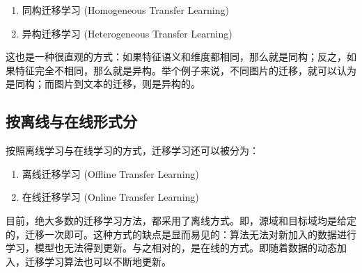 \begin{enumerate}
	\item 同构迁移学习 (Homogeneous Transfer Learning)
	\item 异构迁移学习 (Heterogeneous Transfer Learning)
\end{enumerate}

这也是一种很直观的方式：如果特征语义和维度都相同，那么就是同构；反之，如果特征完全不相同，那么就是异构。举个例子来说，不同图片的迁移，就可以认为是同构；而图片到文本的迁移，则是异构的。

\subsection{按离线与在线形式分}

按照离线学习与在线学习的方式，迁移学习还可以被分为：

\begin{enumerate}
	\item 离线迁移学习 (Offline Transfer Learning)
	\item 在线迁移学习 (Online Transfer Learning)
\end{enumerate}

目前，绝大多数的迁移学习方法，都采用了离线方式。即，源域和目标域均是给定的，迁移一次即可。这种方式的缺点是显而易见的：算法无法对新加入的数据进行学习，模型也无法得到更新。与之相对的，是在线的方式。即随着数据的动态加入，迁移学习算法也可以不断地更新。